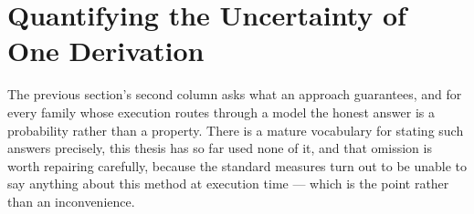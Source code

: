 \section{Quantifying the Uncertainty of One Derivation}
\label{sec:rel:uncertainty}

%

The previous section's second column asks what an approach guarantees, and for every family
whose execution routes through a model the honest answer is a probability rather than a
property. There is a mature vocabulary for stating such answers precisely, this thesis has so
far used none of it, and that omission is worth repairing carefully, because the standard
measures turn out to be unable to say anything about this method at execution time --- which
is the point rather than an inconvenience.

